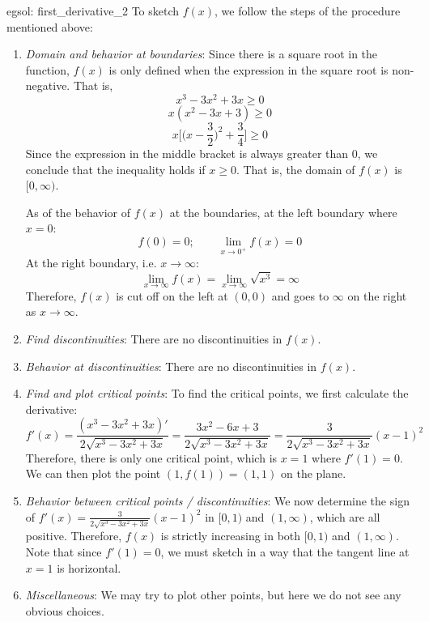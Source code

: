 \begin{egsol}[]{egsol: first_derivative_2}
    To sketch $f(x)$, we follow the steps of the procedure mentioned above:
    
    \begin{enumerate}
        \item \textit{Domain and behavior at boundaries}: Since there is a square root in the function, $f(x)$ is only defined when the expression in the square root is non-negative. That is,
        \[x^3-3x^2+3x \ge 0\]
        \[x(x^2-3x+3) \ge 0\]
        \[x\Big[\Big(x-\frac{3}{2}\Big)^2+\frac{3}{4}\Big] \ge 0\]
        Since the expression in the middle bracket is always greater than $0$, we conclude that the inequality holds if $x \ge 0$.  That is, the domain of $f(x)$ is $[0, \infty)$.
        
        As of the behavior of $f(x)$ at the boundaries, at the left boundary where $x=0$:
        \[f(0) = 0; \qquad \lim_{x\rightarrow 0^+} f(x) = 0\]
        At the right boundary, i.e. $x \rightarrow \infty$:
        \[\lim_{x\rightarrow \infty} f(x) = \lim_{x\rightarrow \infty} \sqrt{x^3} = \infty\]
        Therefore, $f(x)$ is cut off on the left at $(0,0)$ and goes to $\infty$ on the right as $x \rightarrow \infty$.
        \item \textit{Find discontinuities}: There are no discontinuities in $f(x)$.
        \item \textit{Behavior at discontinuities}: There are no discontinuities in $f(x)$.
        \item \textit{Find and plot critical points}: To find the critical points, we first calculate the derivative:
        \[f'(x) = \frac{(x^3-3x^2+3x)'}{2\sqrt{x^3-3x^2+3x}} = \frac{3x^2-6x+3}{2\sqrt{x^3-3x^2+3x}} = \frac{3}{2\sqrt{x^3-3x^2+3x}}(x-1)^2\]
        Therefore, there is only one critical point, which is $x = 1$ where $f'(1) = 0$.  We can then plot the point $(1,f(1)) = (1,1)$ on the plane.
        \item \textit{Behavior between critical points / discontinuities}: We now determine the sign of $f'(x) = \frac{3}{2\sqrt{x^3-3x^2+3x}}(x-1)^2$ in $[0, 1)$ and $(1, \infty)$, which are all positive.  Therefore, $f(x)$ is strictly increasing in both $[0, 1)$ and $(1, \infty)$.  Note that since $f'(1) = 0$, we must sketch in a way that the tangent line at $x=1$ is horizontal.
        \item \textit{Miscellaneous}: We may try to plot other points, but here we do not see any obvious choices.
    \end{enumerate}
    

\end{egsol}
